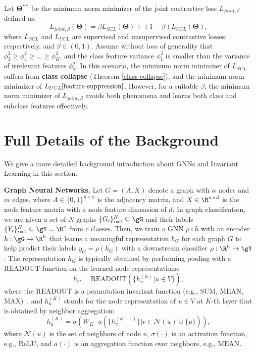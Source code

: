 \begin{theorem}
    Let \( \mathbf{\Theta}^{**} \) be the minimum norm minimizer of the joint contrastive loss \( L_{joint, \beta} \) defined as:
    \[
    L_{joint, \beta}(\mathbf{\Theta}) = \beta L_{SCL}(\mathbf{\Theta}) + (1 - \beta) L_{UCL}(\mathbf{\Theta}),
    \]
    where \( L_{SCL} \) and \( L_{UCL} \) are supervised and unsupervised contrastive losses, respectively, and \( \beta \in (0, 1) \). Assume without loss of generality that \( \phi_3^2 \geq \phi_4^2 \geq \dots \geq \phi_K^2 \), and the class feature variance \( \phi_1^2 \) is smaller than the variance of irrelevant features \( \phi_2^2 \). In this scenario, the minimum norm minimizer of \( L_{SCL} \) suffers from \textbf{class collapse} (Theorem \ref{class-collapse}), and the minimum norm minimizer of \( L_{UCL} \ref{feature-suppression} \).
    However, for a suitable \( \beta \), the minimum norm minimizer of \( L_{joint, \beta} \) avoids both phenomena and learns both class and subclass features effectively.  
\end{theorem}


\section{Full Details of the Background}
\label{sec:prelim_appdx}
We give a more detailed background introduction about GNNs and Invariant Learning in this section.

\textbf{Graph Neural Networks.} Let $G=(A,X)$ denote a graph with $n$ nodes and $m$ edges,
where $A \in \{0,1\}^{n\times n}$ is the adjacency matrix, and $X\in \R^{n \times d}$ is the node feature matrix
with a node feature dimension of $d$.
In graph classification, we are given a set of $N$ graphs $\{G_i\}_{i=1}^N\subseteq \gG$
and their labels $\{Y_i\}_{i=1}^N\subseteq\gY=\R^c$ from $c$ classes.
Then, we train a GNN $\rho \circ h$ with an encoder $h:\gG\rightarrow\R^h$ that learns a meaningful representation $h_G$ for each graph $G$ to help predict their labels $y_G=\rho(h_G)$ with a downstream classifier $\rho:\R^h\rightarrow\gY$.
The representation $h_G$ is typically obtained by performing pooling with a $\text{READOUT}$ function on the learned node representations:
\begin{equation}
    \label{eq:gnn_pooling}
    h_G = \text{READOUT}(\{h^{(K)}_u|u\in V\}),
\end{equation}
where the $\text{READOUT}$ is a permutation invariant function (e.g., $\text{SUM}$, $\text{MEAN}$, $\text{MAX}$)~\citep{gin},
and $h^{(K)}_u$ stands for the node representation of $u\in V$ at $K$-th layer that is obtained by neighbor aggregation:
\begin{equation}
    \label{eq:gnn}
    h^{(K)}_u = \sigma(W_K\cdot a(\{h^{(K-1)}_v\}| v\in\mathcal{N}(u)\cup\{u\})),
\end{equation}
where $\mathcal{N}(u)$ is the set of neighbors of node $u$,
$\sigma(\cdot)$ is an activation function, e.g., $\text{ReLU}$, and $a(\cdot)$ is an aggregation function over neighbors, e.g., $\text{MEAN}$.



